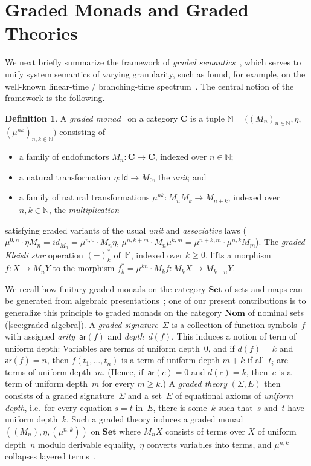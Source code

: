 \documentclass[a4paper,UKenglish,cleveref,thm-restate,numberwithinsect,final]{lipics-v2021}
\newcommand{\ar}{\mathsf{ar}}
\newcommand{\Id}{\mathsf{Id}}
\theoremstyle{plain}
\newcommand{\id}{\mathit{id}}
\numberwithin{equation}{section}
\newcommand{\Nat}{{\mathbb{N}}}
\newcommand{\monad}{{\mathbb{M}}}
\newcommand{\Set}{\mathbf{Set}}
\newcommand{\+}[1]{\mathcal{#1}\xspace}
\newcommand{\Nom}{\mathbf{Nom}}
\newcommand{\BC}{\mathbf{C}}
\theoremstyle{definition}
\newtheorem{defn}[theorem]{Definition}
\begin{document}
\section{Graded Monads and Graded Theories}\label{sec:graded-monads}

\noindent We next briefly summarize the framework of \emph{graded
  semantics}~\cite{MiliusEA15,DorschEA19}, which serves to unify
system semantics of varying granularity, such as found, for example,
on the well-known linear-time / branching-time
spectrum~\cite{Glabbeek90}. The central notion of the framework is the
following.

\begin{defn}\label{def:graded-monad}
  A \emph{graded monad}~\cite{Smirnov08} on a category \(\BC\) is a
  tuple $\monad=((M_n)_{n \in \Nat}, \eta,$
  $(\mu^{nk})_{n, k \in \Nat})$ consisting of
    \begin{itemize}
    \item a family of endofunctors \(M_n\colon \BC \to \BC\), indexed over
      \(n \in \Nat\);
    \item a natural transformation \(\eta: \Id \to M_0\), the
      \emph{unit}; and
    \item a family of natural transformations
      \(\mu^{nk}: M_n M_k \to M_{n + k}\), indexed over
      \(n, k \in \Nat\), the \emph{multiplication}
    \end{itemize}
    satisfying graded variants of the usual \emph{unit} and
    \emph{associative} laws
    ($\mu^{0,n} \cdot \eta M_n = \id_{M_n} = \mu^{n,0} \cdot M_n
    \eta$,
    $\mu^{n,k+m} \cdot M_n \mu^{k,m} = \mu^{n+k,m} \cdot \mu^{n,k}
    M_m$). The \emph{graded Kleisli star} operation $(-)_k^*$
    of~$\monad$, indexed over $k\ge 0$, lifts a morphism
    $f\colon X\to M_nY$ to the morphism
    $f_k^*=\mu^{kn}\cdot M_kf\colon M_kX\to M_{k+n}Y$.
  \end{defn}
  We recall how finitary graded monads on the category $\Set$ of sets
  and maps can be generated from algebraic
  presentations~\cite{Smirnov08,MiliusEA15}; one of our present
  contributions is to generalize this principle to graded monads on
  the category $\Nom$ of nominal sets (\cref{sec:graded-algebra}). A
  \emph{graded signature}~$\Sigma$ is a collection of function
  symbols~$f$ with assigned \emph{arity}~$\ar(f)$ and
  \emph{depth}~$d(f)$. This induces a notion of term of uniform depth:
  Variables are terms of uniform depth~\(0\), and if \(d(f) = k\) and
  $\ar(f)=n$, then \(f(t_1, \ldots, t_n)\) is a term of uniform depth
  \(m + k\) if all~\(t_i\) are terms of uniform depth~\(m\). (Hence,
  if~$\ar(c)=0$ and $d(c)=k$, then~$c$ is a term of uniform depth~$m$
  for every $m\ge k$.) A \emph{graded theory} $(\Sigma,E)$ then
  consists of a graded signature~$\Sigma$ and a set~\(E\) of
  equational axioms of \emph{uniform depth}, i.e.\ for every equation
  $s=t$ in~$E$, there is some~$k$ such that~$s$ and~$t$ have uniform
  depth~$k$. Such a graded theory induces a graded monad
  \(((M_n), \eta, (\mu^{n, k}))\) on $\Set$ where \(M_n X\) consists
  of terms over \(X\) of uniform depth~\(n\) modulo derivable
  equality,~\(\eta\) converts variables into terms, and \(\mu^{n, k}\)
  collapses layered terms~\cite{MiliusEA15}.
\end{document}
